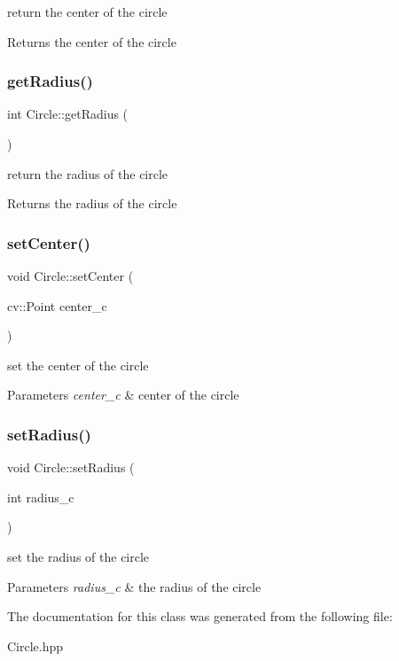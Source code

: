 return the center of the circle \begin{DoxyReturn}{Returns}
the center of the circle 
\end{DoxyReturn}
\mbox{\label{class_circle_adfc2e5e026f5d80215563cc42260a237}} 
\subsubsection{\texorpdfstring{get\+Radius()}{getRadius()}}
{\footnotesize\ttfamily int Circle\+::get\+Radius (\begin{DoxyParamCaption}{ }\end{DoxyParamCaption})}

return the radius of the circle \begin{DoxyReturn}{Returns}
the radius of the circle 
\end{DoxyReturn}
\mbox{\label{class_circle_a242599150a3623ea837fcb599214e33b}} 
\subsubsection{\texorpdfstring{set\+Center()}{setCenter()}}
{\footnotesize\ttfamily void Circle\+::set\+Center (\begin{DoxyParamCaption}\item[{cv\+::\+Point}]{center\+\_\+c }\end{DoxyParamCaption})}

set the center of the circle 
\begin{DoxyParams}{Parameters}
{\em center\+\_\+c} & center of the circle \\
\hline
\end{DoxyParams}
\mbox{\label{class_circle_ae4a8bd93b437b4cf0077483ff84c8626}} 
\subsubsection{\texorpdfstring{set\+Radius()}{setRadius()}}
{\footnotesize\ttfamily void Circle\+::set\+Radius (\begin{DoxyParamCaption}\item[{int}]{radius\+\_\+c }\end{DoxyParamCaption})}

set the radius of the circle 
\begin{DoxyParams}{Parameters}
{\em radius\+\_\+c} & the radius of the circle \\
\hline
\end{DoxyParams}


The documentation for this class was generated from the following file\+:\begin{DoxyCompactItemize}
\item 
Circle.\+hpp\end{DoxyCompactItemize}
